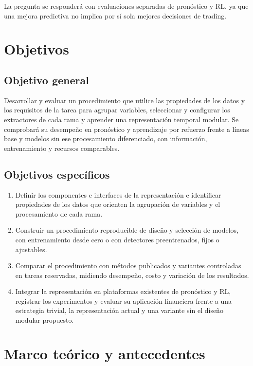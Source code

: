 \documentclass[11pt,letterpaper]{article}
\begin{document}
La pregunta se responderá con evaluaciones separadas de pronóstico y RL, ya que una mejora predictiva no implica por sí sola mejores decisiones de trading.

\section{Objetivos}

\subsection{Objetivo general}

Desarrollar y evaluar un procedimiento que utilice las propiedades de los datos y los requisitos de la tarea para agrupar variables, seleccionar y configurar los extractores de cada rama y aprender una representación temporal modular. Se comprobará su desempeño en pronóstico y aprendizaje por refuerzo frente a líneas base y modelos sin ese procesamiento diferenciado, con información, entrenamiento y recursos comparables.

\subsection{Objetivos específicos}

\begin{enumerate}
\item Definir los componentes e interfaces de la representación e identificar propiedades de los datos que orienten la agrupación de variables y el procesamiento de cada rama.
\item Construir un procedimiento reproducible de diseño y selección de modelos, con entrenamiento desde cero o con detectores preentrenados, fijos o ajustables.
\item Comparar el procedimiento con métodos publicados y variantes controladas en tareas reservadas, midiendo desempeño, costo y variación de los resultados.
\item Integrar la representación en plataformas existentes de pronóstico y RL, registrar los experimentos y evaluar su aplicación financiera frente a una estrategia trivial, la representación actual y una variante sin el diseño modular propuesto.
\end{enumerate}

\section{Marco teórico y antecedentes}
\end{document}
